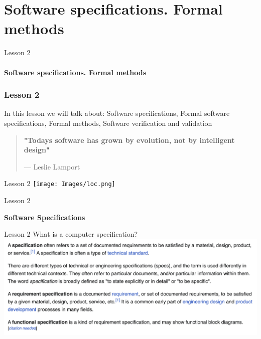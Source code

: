 \documentclass[aspectratio=1610]{beamer}
\begin{document}
\section{Software specifications. Formal methods}

\begin{frame}
\begin{center}
\Huge Lesson 2\\~\\
\textbf{Software specifications. Formal methods}
\end{center}
\end{frame}


\begin{frame}
\frametitle{Lesson 2}

\Huge In this lesson we will talk about:
 \alert{Software specifications},
 \alert{Formal software specifications, Formal methods},
 \alert{Software verification and validation}
\end{frame}



\begin{frame}
\begin{center}
\Huge
\begin{quote}
\textbf{"Todays software has grown by evolution, not by intelligent design"}
\begin{flushright}
{--- Leslie Lamport}	
\end{flushright}
\end{quote}
\end{center}
\end{frame}


\begin{frame}{Lesson 2}{}
\texttt{[image: Images/loc.png]}
\end{frame}


\begin{frame}{Lesson 2}{}
\begin{center}
\Huge\textbf{Software Specifications}
\end{center}
\end{frame}


\begin{frame}{Lesson 2}{}
\Huge{What is a computer specification?}
\includegraphics[scale=0.52]{Images/specs}
\end{frame}
\end{document}
